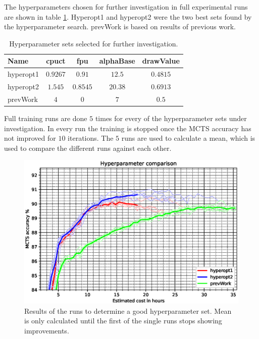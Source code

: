 \documentclass[12pt,onecolumn,oneside,titlepage]{article}
\begin{document}
The hyperparameters chosen for further investigation in full experimental runs are shown in table \ref{t:hyper_search_results}. Hyperopt1 and hyperopt2 were the two best sets found by the hyperparameter search. prevWork is based on results of previous work.

\begin{table} [H]
 \centering
  \begin{tabular}{ l | c c c c }
  Name & cpuct & fpu & alphaBase & drawValue \\
  \hline
  hyperopt1 & $0.9267$ & $0.91$ & $12.5$ & $0.4815$ \\
  hyperopt2 & $1.545$ & $0.8545$ & $20.38$ & $0.6913$ \\
  prevWork & $4$ & $0$ & $7$ & $0.5$ \\
  \end{tabular}
  \caption{Hyperparameter sets selected for further investigation.}
  \label{t:hyper_search_results}
\end{table}

Full training runs are done $5$ times for every of the hyperparameter sets under investigation. In every run the training is stopped once the MCTS accuracy has not improved for $10$ iterations.
The $5$ runs are used to calculate a mean, which is used to compare the different runs against each other.

\begin{figure}[H]
\centering
\includegraphics[clip,width=\columnwidth]{hyper_compare}
\caption{Results of the runs to determine a good hyperparameter set. Mean is only calculated until the first of the single runs stops showing improvements.}
\label{fig:hyper_compare_results}
\end{figure}
\end{document}
